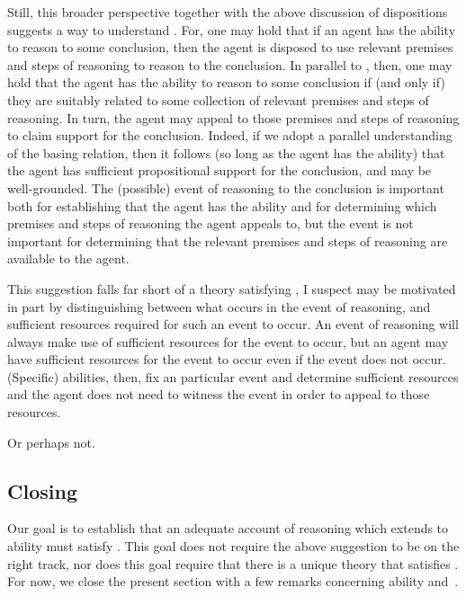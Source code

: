 \begin{note}
  Still, this broader perspective together with the above discussion of dispositions suggests a way to understand \EAS{}.
  For, one may hold that if an agent has the ability to reason to some conclusion, then the agent is disposed to use relevant premises and steps of reasoning to reason to the conclusion.
  In parallel to \citeauthor{Moretti:2019wx}, then, one may hold that the agent has the ability to reason to some conclusion if (and only if) they are suitably related to some collection of relevant premises and steps of reasoning.
  In turn, the agent may appeal to those premises and steps of reasoning to claim support for the conclusion.
  Indeed, if we adopt a parallel understanding of the basing relation, then it follows (so long as the agent has the ability) that  the agent has sufficient propositional support for the conclusion, and may be well-grounded.
  The (possible) event of reasoning to the conclusion is important both for establishing that the agent has the ability and for determining which premises and steps of reasoning the agent appeals to, but the event is not important for determining that the relevant premises and steps of reasoning are available to the agent.

  This suggestion falls far short of a theory satisfying \EAS{}, I suspect \EAS{} may be motivated in part by distinguishing between what occurs in the event of reasoning, and sufficient resources required for such an event to occur.
  An event of reasoning will always make use of sufficient resources for the event to occur, but an agent may have sufficient resources for the event to occur even if the event does not occur.
  (Specific) abilities, then, fix an particular event and determine sufficient resources and the agent does not need to witness the event in order to appeal to those resources.

  Or perhaps not.
\end{note}

\subsection{Closing}
\label{sec:closing}

\begin{note}[Segue]
  Our goal is to establish that an adequate account of reasoning which extends to ability must satisfy \EAS{}.
  This goal does not require the above suggestion to be on the right track, nor does this goal require that there is a unique theory that satisfies \EAS{}.
  For now, we close the present section with a few remarks concerning ability and~\EAS{}.
\end{note}

